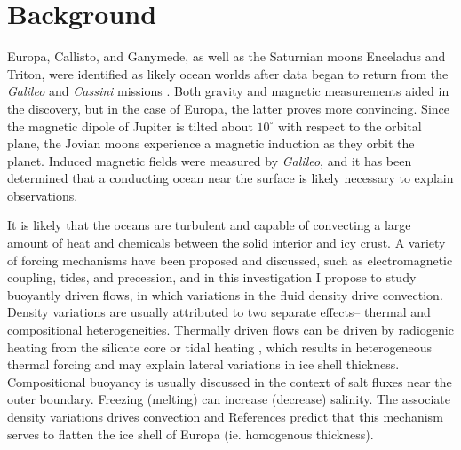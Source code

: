 \documentclass{article}
\begin{document}
\section{Background}
Europa, Callisto, and Ganymede, as well as the Saturnian moons Enceladus and Triton, were identified as likely ocean worlds after data began to return from the \textit{Galileo} and \textit{Cassini} missions \citep{fN16}.
Both gravity and magnetic measurements aided in the discovery, but in the case of Europa, the latter proves more convincing. 
Since the magnetic dipole of Jupiter is tilted about $10^{\circ}$ with respect to the orbital plane, the Jovian moons experience a magnetic induction as they orbit the planet.
Induced magnetic fields were measured by \textit{Galileo}, and it has been determined that a conducting ocean near the surface is likely necessary to explain observations\citep{fN16,cZ00}. 

It is likely that the oceans are turbulent and capable of convecting a large amount of heat and chemicals between the solid interior and icy crust.
A variety of forcing mechanisms have been proposed and discussed, such as electromagnetic coupling\citep{cGlP19}, tides, and precession\citep{kS24}, and in this investigation I propose to study buoyantly driven flows, in which variations in the fluid density drive convection.
Density variations are usually attributed to two separate effects-- thermal and compositional heterogeneities.
Thermally driven flows can be driven by radiogenic heating from the silicate core \citep{kS14,kS19,jK22} or tidal heating \citep{gT03,dL23}, which results in heterogeneous thermal forcing and may explain lateral variations in ice shell thickness. 
Compositional buoyancy is usually discussed in the context of salt fluxes near the outer boundary. 
Freezing (melting) can increase (decrease) salinity. The associate density variations drives convection and References \citep{yA21,wK22} predict that this mechanism serves to flatten the ice shell of Europa (ie.  homogenous thickness). 
\end{document}
